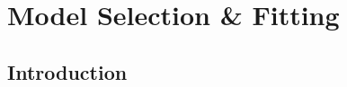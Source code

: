 \chapter{Model Selection \& Fitting }
\label{ch:chapter07}
 
%
%
\section{Introduction}
\label{sec:chapter07:intro}


